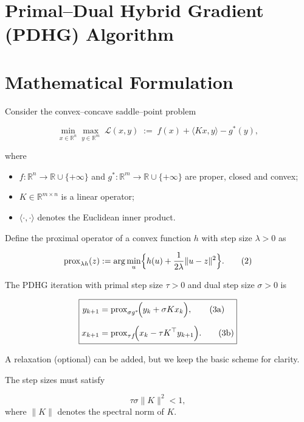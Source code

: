 \documentclass{article}
\newcommand{\prox}{\operatorname{prox}}
\newcommand{\inner}[2]{\langle #1,#2\rangle}
\newcommand{\norm}[1]{\|#1\|}
\begin{document}
\section*{Primal–Dual Hybrid Gradient (PDHG) Algorithm}

\section*{Mathematical Formulation}
Consider the convex–concave saddle–point problem  

\[
\min_{x\in\mathbb{R}^{n}} \max_{y\in\mathbb{R}^{m}}
\; \mathcal{L}(x,y)\;:=\; f(x)+\inner{Kx}{y}-g^{*}(y),
\tag{1}
\]

where  

\begin{itemize}
\item $f:\mathbb{R}^{n}\to\mathbb{R}\cup\{+\infty\}$ and $g^{*}:\mathbb{R}^{m}\to\mathbb{R}\cup\{+\infty\}$ are proper, closed and convex;
\item $K\in\mathbb{R}^{m\times n}$ is a linear operator;
\item $\inner{\cdot}{\cdot}$ denotes the Euclidean inner product.
\end{itemize}

Define the proximal operator of a convex function $h$ with step size $\lambda>0$ as  

\[
\prox_{\lambda h}(z):=\arg\min_{u}\Bigl\{h(u)+\frac{1}{2\lambda}\norm{u-z}^{2}\Bigr\}.
\tag{2}
\]

The PDHG iteration with primal step size $\tau>0$ and dual step size $\sigma>0$ is  

\[
\boxed{
\begin{aligned}
y_{k+1}&=\prox_{\sigma g^{*}}\!\Bigl(y_{k}+\sigma Kx_{k}\Bigr), \tag{3a}\\[2mm]
x_{k+1}&=\prox_{\tau f}\!\Bigl(x_{k}-\tau K^{\top}y_{k+1}\Bigr). \tag{3b}
\end{aligned}}
\]

A relaxation (optional) can be added, but we keep the basic scheme for clarity.

The step sizes must satisfy  

\[
\tau\sigma\|K\|^{2}<1,
\tag{4}
\]
where $\|K\|$ denotes the spectral norm of $K$.

\end{document}
